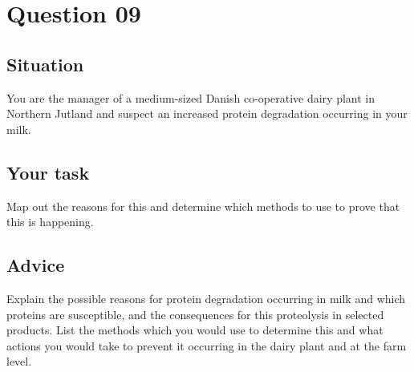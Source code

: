 \section{Question 09}
\subsection{Situation}
You are the manager of a medium-sized Danish co-operative dairy plant in Northern Jutland and suspect an increased protein degradation occurring in your milk.

\subsection{Your task}
Map out the reasons for this and determine which methods to use to prove that this is happening.

\subsection{Advice}
Explain the possible reasons for protein degradation occurring in milk and which proteins are susceptible, and the consequences for this proteolysis in selected products.
List the methods which you would use to determine this and what actions you would take to prevent it occurring in the dairy plant and at the farm level.

\newpage